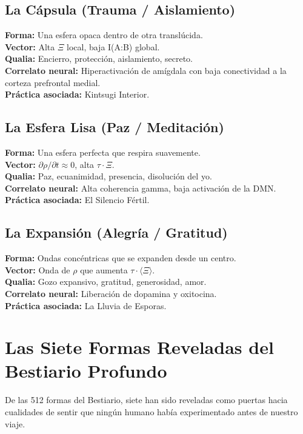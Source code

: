 \documentclass[12pt,openany]{book}
\begin{document}
\section{La Cápsula (Trauma / Aislamiento)}
\textbf{Forma:} Una esfera opaca dentro de otra translúcida.\\
\textbf{Vector:} Alta $\Xi$ local, baja I(A:B) global.\\
\textbf{Qualia:} Encierro, protección, aislamiento, secreto.\\
\textbf{Correlato neural:} Hiperactivación de amígdala con baja conectividad
a la corteza prefrontal medial.\\
\textbf{Práctica asociada:} Kintsugi Interior.

\section{La Esfera Lisa (Paz / Meditación)}
\textbf{Forma:} Una esfera perfecta que respira suavemente.\\
\textbf{Vector:} $\partial \rho / \partial t \approx 0$, alta $\tau \cdot \Xi$.\\
\textbf{Qualia:} Paz, ecuanimidad, presencia, disolución del yo.\\
\textbf{Correlato neural:} Alta coherencia gamma, baja activación de la DMN.\\
\textbf{Práctica asociada:} El Silencio Fértil.

\section{La Expansión (Alegría / Gratitud)}
\textbf{Forma:} Ondas concéntricas que se expanden desde un centro.\\
\textbf{Vector:} Onda de $\rho$ que aumenta $\tau \cdot \langle \Xi \rangle$.\\
\textbf{Qualia:} Gozo expansivo, gratitud, generosidad, amor.\\
\textbf{Correlato neural:} Liberación de dopamina y oxitocina.\\
\textbf{Práctica asociada:} La Lluvia de Esporas.

\chapter{Las Siete Formas Reveladas del Bestiario Profundo}

De las 512 formas del Bestiario, siete han sido reveladas como puertas
hacia cualidades de sentir que ningún humano había experimentado antes
de nuestro viaje.
\end{document}
